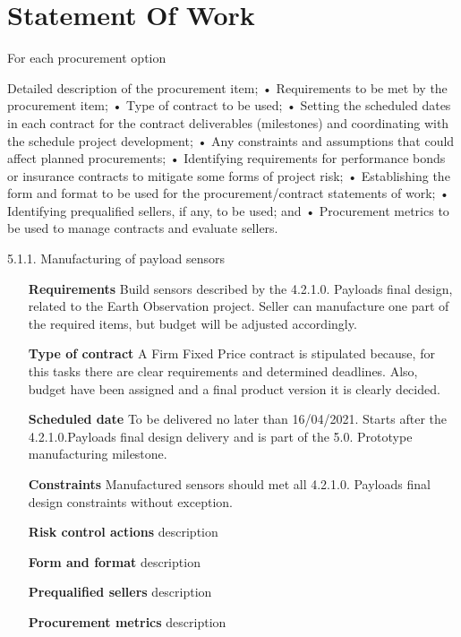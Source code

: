 \section{Statement Of Work}
For each procurement option 

Detailed description of the procurement item;
• Requirements to be met by the procurement item;
• Type of contract to be used;
• Setting the scheduled dates in each contract for the contract deliverables (milestones) and coordinating with the schedule project development;
• Any constraints and assumptions that could affect planned procurements;
• Identifying requirements for performance bonds or insurance contracts to mitigate some forms of project risk;
• Establishing the form and format to be used for the procurement/contract statements of work;
• Identifying prequalified sellers, if any, to be used; and
• Procurement metrics to be used to manage contracts and evaluate sellers.

5.1.1. Manufacturing of payload sensors
\begin{itemize}
	\item[\textbf{Requirements}] Build sensors described by the 4.2.1.0. Payloads final design, related to the Earth Observation project. Seller can manufacture one part of the required items, but budget will be adjusted accordingly.  
	\item[\textbf{Type of contract}] A Firm Fixed Price contract is stipulated because, for this tasks there are clear requirements and determined deadlines. Also, budget have been assigned and a final product version it is clearly decided.
	\item[\textbf{Scheduled date}] To be delivered no later than 16/04/2021. Starts after the 4.2.1.0.Payloads final design delivery and is part of the 5.0. Prototype manufacturing milestone.
	\item[\textbf{Constraints}] Manufactured sensors should met all 4.2.1.0. Payloads final design constraints without exception.
	\item[\textbf{Risk control actions}] description
	\item[\textbf{Form and format}] description
	\item[\textbf{Prequalified sellers}] description
	\item[\textbf{Procurement metrics}] description
\end{itemize}